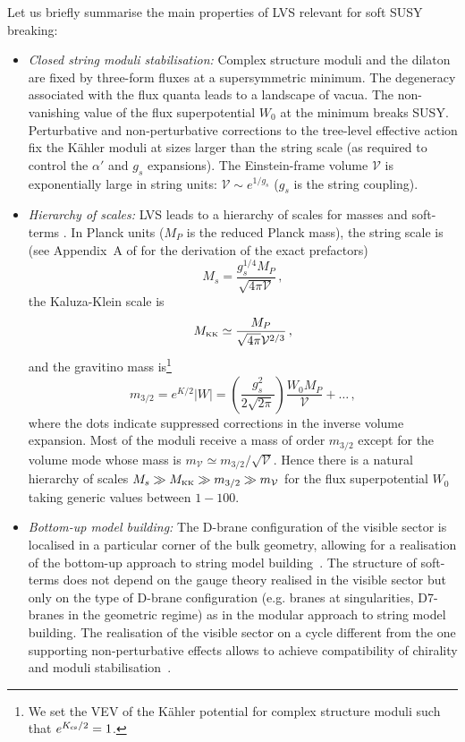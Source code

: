 \documentclass[11pt,a4paper]{article}
\newcommand{\be}{\begin{equation}}
\newcommand{\ee}{\end{equation}}
\def\KK{{\scriptscriptstyle \rm KK}}
\newcommand\vo{{\mathcal{V}}}
\begin{document}
Let us briefly summarise the main properties of LVS relevant for soft SUSY breaking:
\begin{itemize}
\item {\it Closed string moduli stabilisation:} Complex structure moduli and the dilaton
are fixed by three-form fluxes at a supersymmetric minimum. The degeneracy associated with the flux quanta leads to a landscape of vacua.
The non-vanishing value of the flux superpotential $W_0$ at the minimum breaks SUSY.
Perturbative and non-perturbative corrections to the tree-level effective action
fix the K\"ahler moduli at sizes larger than the string scale (as required to control the $\alpha'$ and $g_s$ expansions).
The Einstein-frame volume $\vo$ is exponentially large in string units: $\vo\sim e^{1/g_s}$ ($g_s$ is the string coupling).

\item{\it Hierarchy of scales:} LVS leads to a hierarchy of scales for masses and soft-terms \cite{Conlon:2005ki}.
In Planck units ($M_P$ is the reduced Planck mass), the string scale is (see Appendix~A of \cite{Conlon:2005ki} for the derivation of the exact prefactors)
\be
M_s = \frac{g_s^{1/4} M_P}{\sqrt{4\pi\vo}}\,,
\label{Ms}
\ee
the Kaluza-Klein scale is
\be
M_\KK\simeq \frac{M_P}{\sqrt{4\pi}\vo^{2/3}}\,,
\label{MKK}
\ee
and the gravitino mass is\footnote{We set the VEV of the K\"ahler potential for complex structure moduli such that $e^{{K_{\rm cs}}/2}=1$.}
\be
m_{3/2} = e^{K/2} |W|= \left(\frac{g_s^2}{2\sqrt{2\pi}}\right) \frac{W_0 M_P}{\vo} +\ldots\, ,
\label{m32}
\ee
where the dots indicate suppressed corrections in the inverse volume expansion.
Most of the moduli receive a mass of order $m_{3/2}$ except for the volume mode whose mass is
$m_\vo \simeq m_{3/2}/\sqrt{\vo}$. Hence there is a natural hierarchy of scales $M_s\gg M_\KK\gg m_{3/2}\gg m_\vo$
for the flux superpotential $W_0$ taking generic values between $1-100$.

\item {\it Bottom-up model building:} The D-brane configuration of the visible sector is localised in a particular corner
of the bulk geometry, allowing for a realisation of the bottom-up approach to string model building~\cite{Aldazabal:2000sa}.
The structure of soft-terms does not depend on the gauge theory realised in the visible sector but only on the type of D-brane configuration
(e.g. branes at singularities, D7-branes in the geometric regime) as in the modular approach to string model building.
The realisation of the visible sector on a cycle different from the one supporting non-perturbative effects allows to achieve compatibility of chirality and moduli stabilisation~\cite{Blumenhagen:2007sm,Cicoli:2011qg}.


\end{itemize}
\end{document}
